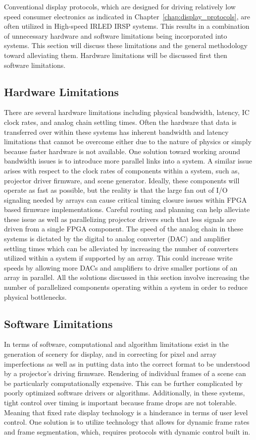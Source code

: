     Conventional display protocols, which are designed for driving relatively low speed consumer electronics as indicated in Chapter~\ref{chap:display_protocols}, are often utilized in High-speed IRLED IRSP systems. This results in a combination of unnecessary hardware and software limitations being incorporated into systems. This section will discuss these limitations and the general methodology toward alleviating them. Hardware limitations will be discussed first then software limitations.

    \subsection{Hardware Limitations}
        There are several hardware limitations including physical bandwidth, latency, IC clock rates, and analog chain settling times. Often the hardware that data is transferred over within these systems has inherent bandwidth and latency limitations that cannot be overcome either due to the nature of physics or simply because faster hardware is not available. One solution toward working around bandwidth issues is to introduce more parallel links into a system. A similar issue arises with respect to the clock rates of components within a system, such as, projector driver firmware, and scene generator. Ideally, these components will operate as fast as possible, but the reality is that the large fan out of I/O signaling needed by arrays can cause critical timing closure issues within FPGA based firmware implementations. Careful routing and planning can help alleviate these issue as well as parallelizing projector drivers such that less signals are driven from a single FPGA component. The speed of the analog chain in these systems is dictated by the digital to analog converter (DAC) and amplifier settling times which can be alleviated by increasing the number of converters utilized within a system if supported by an array. This could increase write speeds by allowing more DACs and amplifiers to drive smaller portions of an array in parallel. All the solutions discussed in this section involve increasing the number of parallelized components operating within a system in order to reduce physical bottlenecks.

    \subsection{Software Limitations}
        In terms of software, computational and algorithm limitations exist in the generation of scenery for display, and in correcting for pixel and array imperfections as well as in putting data into the correct format to be understood by a projector's driving firmware. Rendering of individual frames of a scene can be particularly computationally expensive. This can be further complicated by poorly optimized software drivers or algorithms. Additionally, in these systems, tight control over timing is important because frame drops are not tolerable. Meaning that fixed rate display technology is a hinderance in terms of user level control. One solution is to utilize technology that allows for dynamic frame rates and frame segmentation, which, requires protocols with dynamic control built in.


